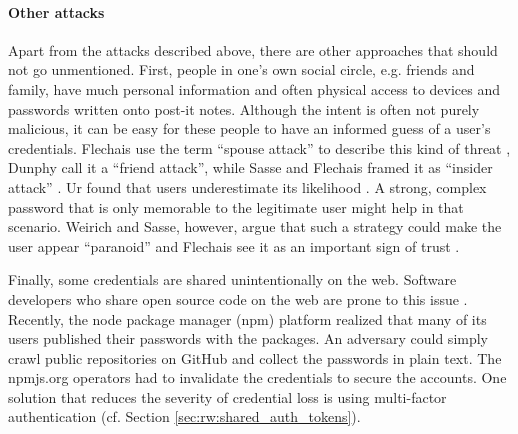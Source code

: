 \paragraph{Other attacks} 
Apart from the attacks described above, there are other approaches that should not go unmentioned. First, people in one's own social circle, e.g. friends and family, have much personal information and often physical access to devices and passwords written onto post-it notes. Although the intent is often not purely malicious, it can be easy for these people to have an informed guess of a user's credentials. Flechais \etal use the term ``spouse attack'' to describe this kind of threat \cite{Flechais2013SaudiArabiaTrust}, Dunphy \etal call it a ``friend attack'', while Sasse and Flechais framed it as ``insider attack'' \cite{Sasse2005UsableSecurityPosition}. Ur \etal found that users underestimate its likelihood \cite{Ur2016PerceptionsPassword}. A strong, complex password that is only memorable to the legitimate user might help in that scenario. Weirich and Sasse, however, argue that such a strategy could make the user appear ``paranoid'' \cite{Weirich2001PrettyGoodPersuasion} and Flechais \etal see it as an important sign of trust \cite{Flechais2005DivideConquerTrust, Flechais2013SaudiArabiaTrust}. 
 
Finally, some credentials are shared unintentionally on the web. Software developers who share open source code on the web are prone to this issue \cite{Conklin2004PWAuthenticationSystemPerspective}. Recently, the node package manager (npm) platform realized that many of its users published their passwords with the packages. An adversary could simply crawl public repositories on GitHub and collect the passwords in plain text. The npmjs.org operators had to invalidate the credentials to secure the accounts. One solution that reduces the severity of credential loss is using multi-factor authentication (cf. Section \ref{sec:rw:shared_auth_tokens}).






